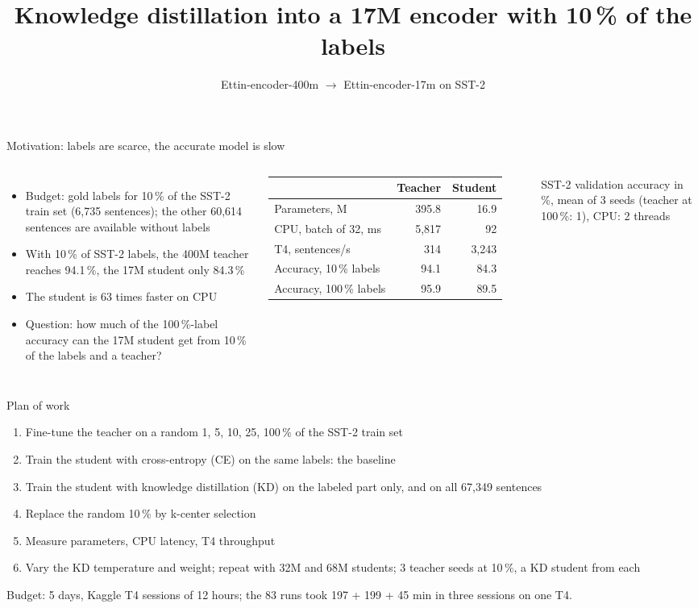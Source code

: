 \documentclass[aspectratio=169,11pt]{beamer}
\title{Knowledge distillation into a 17M encoder with 10\,\% of the labels}
\subtitle{Ettin-encoder-400m $\to$ Ettin-encoder-17m on SST-2}
\institute{Group project, Efficient Models course, ITMO 2026}
\date{}
\begin{document}
\begin{frame}
  \titlepage
\end{frame}

\begin{frame}{Motivation: labels are scarce, the accurate model is slow}
  \begin{columns}[T]
    \begin{itemize}
      \item Budget: gold labels for 10\,\% of the SST-2 train set (6,735 sentences); the other 60,614 sentences are available without labels
      \item With 10\,\% of SST-2 labels, the 400M teacher reaches 94.1\,\%, the 17M student only 84.3\,\%
      \item The student is 63 times faster on CPU
      \item Question: how much of the 100\,\%-label accuracy can the 17M student get from 10\,\% of the labels and a teacher?
    \end{itemize}
    \small
    \begin{tabular}{lrr}
      \toprule
      & Teacher & Student \\
      \midrule
      Parameters, M & 395.8 & 16.9 \\
      CPU, batch of 32, ms & 5,817 & 92 \\
      T4, sentences/s & 314 & 3,243 \\
      Accuracy, 10\,\% labels & 94.1 & 84.3 \\
      Accuracy, 100\,\% labels & 95.9 & 89.5 \\
      \bottomrule
    \end{tabular}

    \footnotesize SST-2 validation accuracy in \%, mean of 3 seeds (teacher at 100\,\%: 1), CPU: 2 threads
  \end{columns}
\end{frame}

\begin{frame}{Plan of work}
  \begin{enumerate}
    \item Fine-tune the teacher on a random 1, 5, 10, 25, 100\,\% of the SST-2 train set
    \item Train the student with cross-entropy (CE) on the same labels: the baseline
    \item Train the student with knowledge distillation (KD) on the labeled part only, and on all 67,349 sentences
    \item Replace the random 10\,\% by k-center selection
    \item Measure parameters, CPU latency, T4 throughput
    \item Vary the KD temperature and weight; repeat with 32M and 68M students; 3 teacher seeds at 10\,\%, a KD student from each
  \end{enumerate}
  \medskip
  Budget: 5 days, Kaggle T4 sessions of 12 hours; the 83 runs took 197 + 199 + 45 min in three sessions on one T4.
\end{frame}
\end{document}
